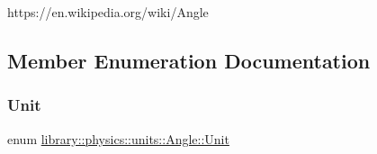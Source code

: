 https\+://en.wikipedia.\+org/wiki/\+Angle 

\subsection{Member Enumeration Documentation}
\mbox{\label{classlibrary_1_1physics_1_1units_1_1_angle_a3c329d415a61783b16ce481874cc5956}} 
\subsubsection{\texorpdfstring{Unit}{Unit}}
{\footnotesize\ttfamily enum \hyperlink{classlibrary_1_1physics_1_1units_1_1_angle_a3c329d415a61783b16ce481874cc5956}{library\+::physics\+::units\+::\+Angle\+::\+Unit}\hspace{0.3cm}{\ttfamily [strong]}}

